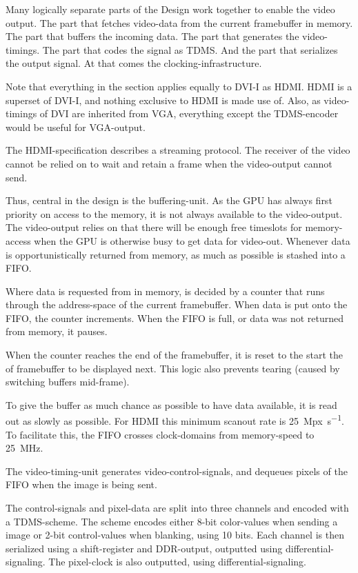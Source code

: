 \documentclass[../main/report.tex]{subfiles}
\begin{document}
Many logically separate parts of the Design work together to enable the video output.
The part that fetches video-data from the current framebuffer in memory.
The part that buffers the incoming data.
The part that generates the video-timings.
The part that codes the signal as TDMS.
And the part that serializes the output signal.
At that comes the clocking-infrastructure.

Note that everything in the section applies equally to DVI-I as HDMI. HDMI is a superset of DVI-I, and nothing exclusive to HDMI is made use of.
Also, as video-timings of DVI are inherited from VGA, everything except the TDMS-encoder would be useful for VGA-output.

The HDMI-specification describes a streaming protocol.
The receiver of the video cannot be relied on to wait and retain a frame when the video-output cannot send.

Thus, central in the design is the buffering-unit.
As the GPU has always first priority on access to the memory, it is not always available to the video-output.
The video-output relies on that there will be enough free timeslots for memory-access when the GPU is otherwise busy to get data for video-out.
Whenever data is opportunistically returned from memory, as much as possible is stashed into a FIFO.

Where data is requested from in memory, is decided by a counter that runs through the address-space of the current framebuffer.
When data is put onto the FIFO, the counter increments. %
When the FIFO is full, or data was not returned from memory, it pauses.

When the counter reaches the end of the framebuffer, it is reset to the start the of framebuffer to be displayed next.
This logic also prevents tearing (caused by switching buffers mid-frame).

To give the buffer as much chance as possible to have data available, it is read out as slowly as possible.
For HDMI this minimum scanout rate is \SI{25}{Mpx\per s}.
To facilitate this, the FIFO crosses clock-domains from memory-speed to \SI{25}{MHz}.


The video-timing-unit generates video-control-signals, and dequeues pixels of the FIFO when the image is being sent.

The control-signals and pixel-data are split into three channels and encoded with a TDMS-scheme.
The scheme encodes either 8-bit color-values when sending a image or 2-bit control-values when blanking, using 10 bits.
Each channel is then serialized using a shift-register and DDR-output, outputted using differential-signaling.
The pixel-clock is also outputted, using differential-signaling.
\end{document}
